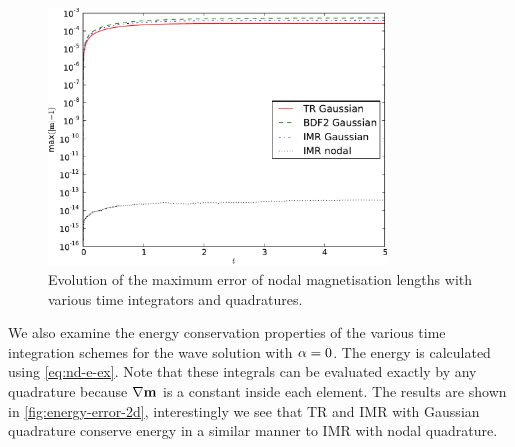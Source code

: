 \begin{figure}
  \centering
  \includegraphics[width=0.8\textwidth]{plots/2d_wave_solution_m_length/mlengtherrormaxesvstimes.pdf}
  \caption{Evolution of the maximum error of nodal magnetisation lengths with various time integrators and quadratures.}
  \label{fig:mean-ml-error-2d}
\end{figure}



We also examine the energy conservation properties of the various time integration schemes for the wave solution with $\alpha = 0$.
The energy is calculated using \cref{eq:nd-e-ex}.
Note that these integrals can be evaluated exactly by any quadrature because $\nabla \boldsymbol{\mathrm{m}}$ is a constant inside each element.
The results are shown in \cref{fig:energy-error-2d}, interestingly we see that TR and IMR with Gaussian quadrature conserve energy in a similar manner to IMR with nodal quadrature.

